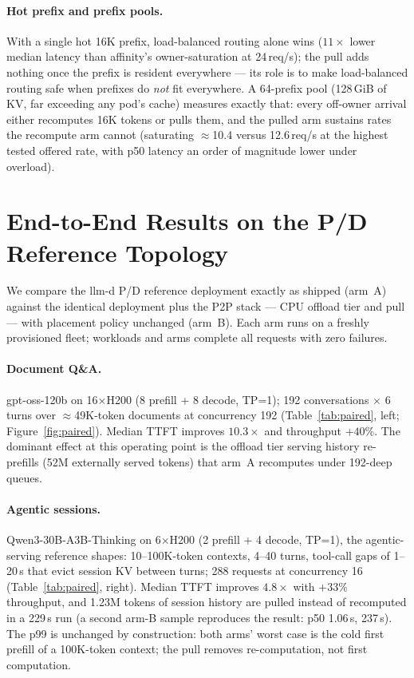 \documentclass[twocolumn,10pt]{article}
\newcommand{\llmd}{llm-d}
\begin{document}
\paragraph{Hot prefix and prefix pools.} With a single hot 16K prefix,
load-balanced routing alone wins ($11\times$ lower median latency than
affinity's owner-saturation at 24\,req/s); the pull adds nothing once
the prefix is resident everywhere --- its role is to make load-balanced
routing safe when prefixes do \emph{not} fit everywhere. A 64-prefix
pool (128\,GiB of KV, far exceeding any pod's cache) measures exactly
that: every off-owner arrival either recomputes 16K tokens or pulls
them, and the pulled arm sustains rates the recompute arm cannot
(saturating $\approx$10.4 versus 12.6\,req/s at the highest tested
offered rate, with p50 latency an order of magnitude lower under
overload).

\section{End-to-End Results on the P/D Reference Topology}
\label{sec:e2e}
We compare the \llmd{} P/D reference deployment exactly as shipped
(arm~A) against the identical deployment plus the P2P stack --- CPU
offload tier and pull --- with placement policy unchanged (arm~B). Each
arm runs on a freshly provisioned fleet; workloads and arms complete
all requests with zero failures.

\paragraph{Document Q\&A.} gpt-oss-120b on 16$\times$H200 (8 prefill +
8 decode, TP=1); 192 conversations $\times$ 6 turns over
$\approx$49K-token documents at concurrency 192
(Table~\ref{tab:paired}, left; Figure~\ref{fig:paired}). Median TTFT
improves $10.3\times$ and throughput $+40\%$. The dominant effect at
this operating point is the offload tier serving history re-prefills
(52M externally served tokens) that arm~A recomputes under 192-deep
queues.

\paragraph{Agentic sessions.} Qwen3-30B-A3B-Thinking on 6$\times$H200
(2 prefill + 4 decode, TP=1), the agentic-serving reference shapes:
10--100K-token contexts, 4--40 turns, tool-call gaps of 1--20\,s that
evict session KV between turns; 288 requests at concurrency 16
(Table~\ref{tab:paired}, right). Median TTFT improves $4.8\times$ with
$+33\%$ throughput, and 1.23M tokens of session history are pulled
instead of recomputed in a 229\,s run (a second arm-B sample reproduces
the result: p50 1.06\,s, 237\,s). The p99 is unchanged by construction:
both arms' worst case is the cold first prefill of a 100K-token
context; the pull removes re-computation, not first computation.
\end{document}
